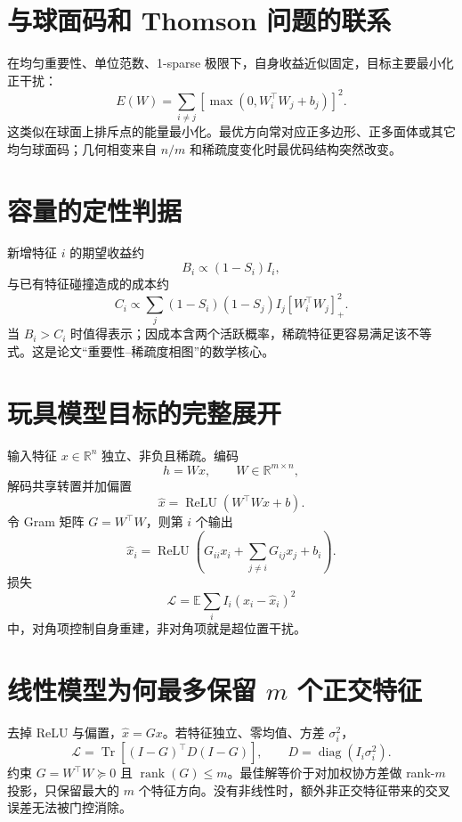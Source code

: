 \documentclass[UTF8,12pt,a4paper,fontset=none]{ctexart}
\numberwithin{equation}{section}
\newcommand{\R}{\mathbb{R}}
\newcommand{\E}{\mathbb{E}}
\newcommand{\Loss}{\mathcal{L}}
\newcommand{\tr}{\operatorname{Tr}}
\newcommand{\diag}{\operatorname{diag}}
\newcommand{\rank}{\operatorname{rank}}
\begin{document}
\section{与球面码和 Thomson 问题的联系}
在均匀重要性、单位范数、1-sparse 极限下，自身收益近似固定，目标主要最小化正干扰：
\begin{equation}
 E(W)=\sum_{i\ne j}\left[\max(0,W_i^\top W_j+b_j)
\right]^2.
\end{equation}
这类似在球面上排斥点的能量最小化。最优方向常对应正多边形、正多面体或其它均匀球面码；几何相变来自 $n/m$ 和稀疏度变化时最优码结构突然改变。

\section{容量的定性判据}
新增特征 $i$ 的期望收益约
\begin{equation}
 B_i\propto (1-S_i)I_i,
\end{equation}
与已有特征碰撞造成的成本约
\begin{equation}
 C_i\propto \sum_j(1-S_i)(1-S_j)I_j[W_i^\top W_j]_+^2.
\end{equation}
当 $B_i>C_i$ 时值得表示；因成本含两个活跃概率，稀疏特征更容易满足该不等式。这是论文“重要性--稀疏度相图”的数学核心。

\section{玩具模型目标的完整展开}
输入特征 $x\in\R^n$ 独立、非负且稀疏。编码
\begin{equation}
 h=Wx,
 \qquad W\in\R^{m\times n},
\end{equation}
解码共享转置并加偏置
\begin{equation}
 \widehat x=\operatorname{ReLU}(W^\top Wx+b).
\end{equation}
令 Gram 矩阵 $G=W^\top W$，则第 $i$ 个输出
\begin{equation}
 \widehat x_i=\operatorname{ReLU}
 \left(G_{ii}x_i+\sum_{j\ne i}G_{ij}x_j+b_i\right).
\end{equation}
损失
\begin{equation}
 \Loss=\E\sum_iI_i(x_i-\widehat x_i)^2
\end{equation}
中，对角项控制自身重建，非对角项就是超位置干扰。

\section{线性模型为何最多保留 $m$ 个正交特征}
去掉 ReLU 与偏置，$\widehat x=Gx$。若特征独立、零均值、方差 $\sigma_i^2$，
\begin{equation}
 \Loss=\tr[(I-G)^\top D(I-G)],
 \qquad D=\diag(I_i\sigma_i^2).
\end{equation}
约束 $G=W^\top W\succeq0$ 且 $\rank(G)\le m$。最佳解等价于对加权协方差做 rank-$m$ 投影，只保留最大的 $m$ 个特征方向。没有非线性时，额外非正交特征带来的交叉误差无法被门控消除。
\end{document}
